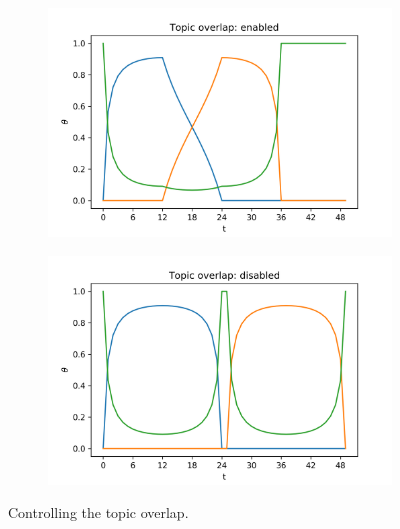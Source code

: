 \documentclass{mpaper}
\begin{document}
\begin{figure}
  \centering
  \begin{subfigure}[b]{0.48\textwidth}
    \includegraphics[width=\linewidth]{theta_topic-ol.png}
  \end{subfigure}%

  \begin{subfigure}[b]{0.48\textwidth}
    \includegraphics[width=\linewidth]{theta_topic-nonol.png}
  \end{subfigure}%
  \caption{Controlling the topic overlap.}
  \label{fig:ol_topics}


\end{figure}
\end{document}
